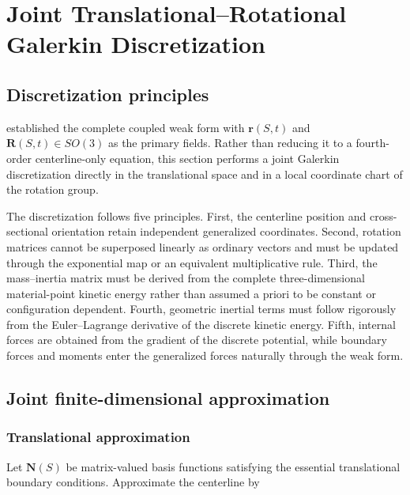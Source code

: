 \section{Joint Translational--Rotational Galerkin Discretization}\label{sec:galerkin-discretization}

\subsection{Discretization principles}\label{sec:galerkin-2-1}

 established the complete coupled weak form with \(\mathbf{r}(S,t)\) and \(\mathbf{R}(S,t) \in SO(3)\) as the primary fields. Rather than reducing it to a fourth-order centerline-only equation, this section performs a joint Galerkin discretization directly in the translational space and in a local coordinate chart of the rotation group.

The discretization follows five principles. First, the centerline position and cross-sectional orientation retain independent generalized coordinates. Second, rotation matrices cannot be superposed linearly as ordinary vectors and must be updated through the exponential map or an equivalent multiplicative rule. Third, the mass--inertia matrix must be derived from the complete three-dimensional material-point kinetic energy rather than assumed a priori to be constant or configuration dependent. Fourth, geometric inertial terms must follow rigorously from the Euler--Lagrange derivative of the discrete kinetic energy. Fifth, internal forces are obtained from the gradient of the discrete potential, while boundary forces and moments enter the generalized forces naturally through the weak form.\cite{Sola2018MicroLie,MarsdenRatiu1999MechanicsSymmetry,HairerLubichWanner2006GNI}

\subsection{Joint finite-dimensional approximation}\label{sec:galerkin-2-2}

\subsubsection{Translational approximation}\label{sec:galerkin-2-2-1}

Let \(\mathbf{N}(S)\) be matrix-valued basis functions satisfying the essential translational boundary conditions. Approximate the centerline by

